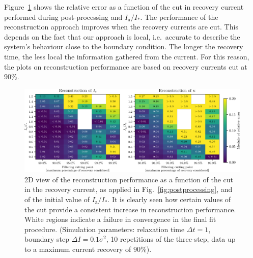 {Figure~\ref{fig:different_cut} shows the relative error as a function of the cut in recovery current performed during post-processing and $I_\mathrm{a}/I_\ast$. The performance of the reconstruction approach improves when the recovery currents are cut. This depends on the fact that our approach is local, i.e.\ accurate to describe the system's behaviour close to the boundary condition. The longer the recovery time, the less local the information gathered from the current. For this reason, the plots on reconstruction performance are based on recovery currents cut at $90\%$. 

\begin{figure}[htp]
    \centering
    \includegraphics[width=\textwidth]{4_probing_the_diffusive_behavior/figs/final/MULTI_different_filter.pdf}
    \caption{2D view of the reconstruction performance as a function of the cut in the recovery current, as applied in Fig.~\ref{fig:postprocessing}, and of the initial value of $I_\mathrm{a}/I_\ast$. It is clearly seen how certain values of the cut provide a consistent increase in reconstruction performance. White regions indicate a failure in convergence in the final fit procedure. (Simulation parameters: relaxation time $\Delta t=1$, boundary step $\Delta I=0.1 \sigma^2$, 10 repetitions of the three-step, data up to a maximum current recovery of $90\%$).}
    \label{fig:different_cut}
\end{figure}

}
